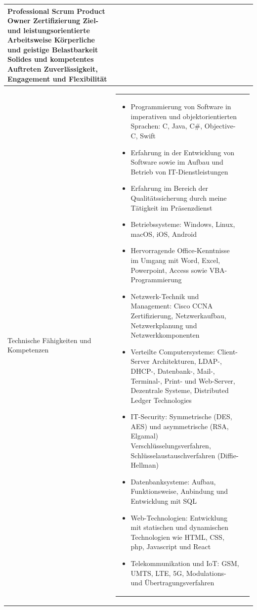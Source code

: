 \begin{longtable}{p{}|p{}}
	\tabitem Professional Scrum Product Owner Zertifizierung \newline
	\tabitem Ziel- und leistungsorientierte Arbeitsweise \newline
	\tabitem Körperliche und geistige Belastbarkeit \newline
	\tabitem Solides und kompetentes Auftreten \newline
	\tabitem Zuverlässigkeit, Engagement und Flexibilität \\
	\bottomrule
	Technische Fähigkeiten und Kompetenzen &
	\begin{tabular} {m{} m{} }
	\begin{itemize}[nosep,leftmargin=1em]
	\item Programmierung von Software in imperativen und objektorientierten Sprachen: C, Java, C\#, Objective-C, Swift
	\item Erfahrung in der Entwicklung von Software sowie im Aufbau und Betrieb von IT-Dienstleistungen
	\item Erfahrung im Bereich der Qualitätssicherung durch meine Tätigkeit im Präsenzdienst
	\item Betriebssysteme: Windows, Linux, macOS, iOS, Android
	\item Hervorragende Office-Kenntnisse im Umgang mit Word, Excel, Powerpoint, Access sowie VBA-Programmierung
	\item Netzwerk-Technik und Management: Cisco CCNA Zertifizierung, Netzwerkaufbau, Netzwerkplanung und Netzwerkkomponenten
	\item Verteilte Computersysteme: Client-Server Architekturen, LDAP-, DHCP-, Datenbank-, Mail-, Terminal-, Print- und Web-Server, Dezentrale Systeme, Distributed Ledger Technologies
	\item IT-Security: Symmetrische (DES, AES) und asymmetrische (RSA, Elgamal) Verschlüsselungsverfahren, Schlüsselaustauschverfahren (Diffie-Hellman)
	\item Datenbanksysteme: Aufbau, Funktionsweise, Anbindung und Entwicklung mit SQL
	\item Web-Technologien: Entwicklung mit statischen und dynamischen Technologien wie HTML, CSS, php, Javascript und React
	\item Telekommunikation und IoT: GSM, UMTS, LTE, 5G, Modulations- und Übertragungsverfahren %
	\end{itemize}
	\end{tabular}
	\\

\end{longtable}
